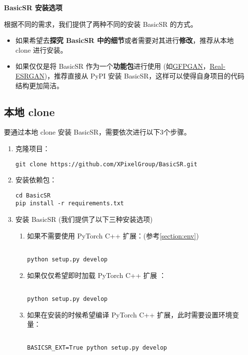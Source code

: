 \documentclass[../main.tex]{subfiles}
\begin{document}
\begin{hl} %
	\textbf{BasicSR 安装选项}

	根据不同的需求，我们提供了两种不同的安装 BasicSR 的方式。
	\begin{itemize}
		\item 如果希望去\textbf{探究 BasicSR 中的细节}或者需要对其进行\textbf{修改}，推荐从本地 clone 进行安装。
		\item 如果仅仅是将 BasicSR 作为一个\textbf{功能包}进行使用 (如\href{https://github.com/TencentARC/GFPGAN}{GFPGAN}，\href{https://github.com/xinntao/Real-ESRGAN}{Real-ESRGAN})，推荐直接从 PyPI 安装 BasicSR，这样可以使得自身项目的代码结构更加简洁。
	\end{itemize}
\end{hl}

\subsection{本地 clone}

要通过本地 clone 安装 BasicSR，需要依次进行以下3个步骤。

\begin{enumerate}
    \item 克隆项目：
    \begin{verbatim}
git clone https://github.com/XPixelGroup/BasicSR.git
    \end{verbatim}

    \item 安装依赖包：
    \begin{verbatim}
cd BasicSR
pip install -r requirements.txt
    \end{verbatim}

    \item 安装 BasicSR (我们提供了以下三种安装选项)

    \begin{enumerate}
    \item 如果不需要使用 PyTorch C++ 扩展：(参考\ref{section:env})
    \begin{verbatim}

python setup.py develop

    \end{verbatim}

    \item 如果仅仅希望即时加载 PyTorch C++ 扩展 ：
    \begin{verbatim}

python setup.py develop

    \end{verbatim}
    \item 如果在安装的时候希望编译 PyTorch C++ 扩展，此时需要设置环境变量：
    \begin{verbatim}

BASICSR_EXT=True python setup.py develop

    \end{verbatim}
\end{enumerate}


\end{enumerate}
\end{document}
